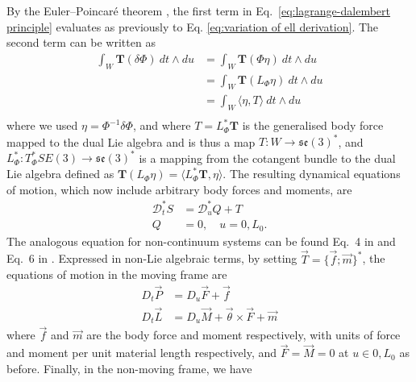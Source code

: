 By the Euler–Poincaré theorem \citep{wisniewskiEulerPoincarReductionExternally}, the first term in Eq.~\ref{eq:lagrange-dalembert principle} evaluates as previously to Eq. \ref{eq:variation of ell derivation}. The second term can be written as
\begin{equation} \label{eq:T derivation}
\begin{aligned}
\int_W \mathbf{T}(\delta \Phi)\ dt \wedge du & = \int_W \mathbf{T}( \Phi \eta )\ dt \wedge du \\
& = \int_W \mathbf{T}( L_\Phi \eta )\ dt \wedge du \\
& = \int_W \langle \eta, T \rangle \ dt \wedge du \\
\end{aligned}
\end{equation}
where we used $\eta = \Phi^{-1} \delta \Phi$, and where $T = L^*_\Phi \mathbf{T}$ is the generalised body force mapped to the dual Lie algebra and is thus a map $T : W \to \mathfrak{se}(3)^*$, and $L^*_\Phi : T^*_\Phi SE(3) \to \mathfrak{se}(3)^*$ is a mapping from the cotangent bundle to the dual Lie algebra defined as $\mathbf{T}( L_\Phi \eta ) = \langle L^*_\Phi \mathbf{T}, \eta \rangle$. The resulting dynamical equations of motion, which now include arbitrary body forces and moments, are
\begin{subequations} \label{eq:dynamics eoms with body forces}
\begin{align}
\mathcal{D}^*_t S & = \mathcal{D}^*_u Q + T \\
Q & = 0, \quad u = 0, L_0. 
\end{align}
\end{subequations}
The analogous equation for non-continuum systems can be found Eq.~4 in \cite{marleHenriPoincareNote2013a} and Eq.~6 in \citep{wisniewskiEulerPoincarReductionExternally}. Expressed in non-Lie algebraic terms, by setting $\vec{T} = \{ \vec{f} ; \vec{m} \}^*$, the equations of motion in the moving frame are
\begin{subequations} \label{eq:dynamics in terms of V and L with body forces}
\begin{align}
D_t \vec{P} & = D_u \vec{F} + \vec{f} \\
D_t \vec{L} & = D_u \vec{M} + \vec{\theta} \times \vec{F} + \vec{m}
\end{align} \label{eq:dynamics in terms of V and L in moving frame with body forces}
\end{subequations}
where $\vec{f}$ and $\vec{m}$ are the body force and moment respectively, with units of force and moment per unit material length respectively, and $\vec{F} = \vec{M} = 0$ at $u \in 0, L_0$ as before. Finally, in the non-moving frame, we have
